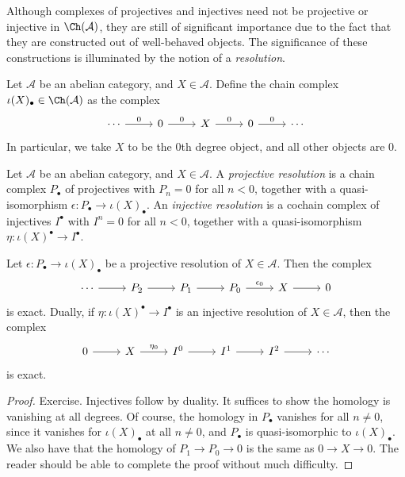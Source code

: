 Although complexes of projectives and injectives need not be projective or injective in $\Ch(\mathcal{A} ) $, they are still of significant importance due to the fact that they are constructed out of well-behaved objects. The significance of these constructions is illuminated by the notion of a \emph{resolution}.

\begin{definition}\label{6.8}
	Let $\mathcal{A} $ be an abelian category, and $X\in \mathcal{A} $. Define the chain complex $\iota (X)_{\bullet} \in \Ch(\mathcal{A} )$ as the complex
	\[\begin{tikzcd}[row sep = 2.5em, column sep = 2.5em]
	\cdots \ar[" 0 ", r] & 0\ar[" 0 ", r]  & X\ar[" 0 ", r]  & 0\ar[" 0 ", r]  & \cdots
	\end{tikzcd}\]
	In particular, we take $X$ to be the 0th degree object, and all other objects are 0.
\end{definition}

\begin{definition}\label{6.9}
	Let $\mathcal{A} $ be an abelian category, and $X\in \mathcal{A} $. A \emph{projective resolution} is a chain complex $P_{\bullet} $ of projectives with $P_n=0$ for all $n<0$, together with a quasi-isomorphism $\epsilon : P_{\bullet}  \to \iota (X)_{\bullet} $. An \emph{injective resolution} is a cochain complex of injectives $I^{\bullet} $ with $I^n=0$ for all $n<0$, together with a quasi-isomorphism $\eta : \iota (X)^{\bullet}  \to I^{\bullet} $.
\end{definition}

\begin{proposition}\label{6.10}
	Let $\epsilon : P_{\bullet}  \to \iota (X)_{\bullet} $ be a projective resolution of $X\in \mathcal{A} $. Then the complex
	\[\begin{tikzcd}[row sep = 2.5em, column sep = 2.5em]
		\cdots \ar[r] & P_2\ar[r]  & P_1\ar[r]  & P_0\ar[" \epsilon_0  ", r]  & X \ar[r] &0
	\end{tikzcd}\]
	is exact. Dually, if $\eta : \iota (X)^{\bullet}  \to I^{\bullet} $ is an injective resolution of $X\in \mathcal{A} $, then the complex
	\[\begin{tikzcd}[row sep = 2.5em, column sep = 2.5em]
		0\ar[r]  & X\ar[" \eta _0 ", r]  & I^0\ar[r]  & I^1\ar[r]  & I^2\ar[r]  & \cdots
	\end{tikzcd}\]
	is exact.
\end{proposition}
\begin{proof}
	Exercise. Injectives follow by duality. It suffices to show the homology is vanishing at all degrees. Of course, the homology in $P_{\bullet} $ vanishes for all $n\neq 0$, since it vanishes for $\iota (X)_{\bullet} $ at all $n\neq 0$, and $P_{\bullet} $ is quasi-isomorphic to $\iota (X)_{\bullet} $. We also have that the homology of $P_1\to P_0\to 0$ is the same as $0\to X\to 0$. The reader should be able to complete the proof without much difficulty.
\end{proof}

